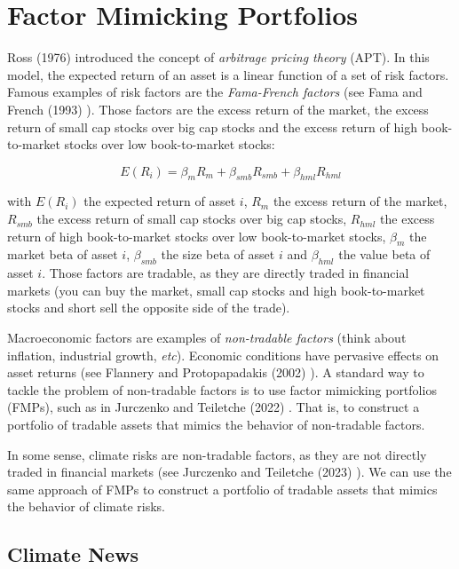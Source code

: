 \chapter{Factor Mimicking Portfolios}


Ross (1976) \cite{ross1976apt} introduced 
the concept of \textit{arbitrage pricing theory} (APT).
In this model, the expected return of an asset is
a linear function of a set of risk factors. Famous examples of risk factors are the
\textit{Fama-French factors} (see Fama and French (1993) \cite{fama1993common}).
Those factors are the excess return of the market,
the excess return of small cap stocks over big cap stocks
and the excess return of high book-to-market stocks over low book-to-market stocks:

\begin{equation}
    E(R_i) = \beta_m R_m + \beta_{smb} R_{smb} + \beta_{hml} R_{hml}
\end{equation}

with $E(R_i)$ the expected return of asset $i$,
$R_m$ the excess return of the market, $R_{smb}$ the excess return of small cap stocks over big cap stocks,
$R_{hml}$ the excess return of high book-to-market stocks over low book-to-market stocks,
$\beta_m$ the market beta of asset $i$, $\beta_{smb}$ the size beta of asset $i$ and $\beta_{hml}$ the value beta of asset $i$.
Those factors are tradable, as 
they are directly traded in financial markets (you can buy 
the market, small cap stocks and high book-to-market stocks
and short sell the opposite side of the trade).

Macroeconomic factors are examples of 
\textit{non-tradable factors} (think about inflation, 
industrial growth, \textit{etc}). Economic conditions 
have pervasive effects on asset returns (see Flannery 
and Protopapadakis (2002) \cite{flannery2002macroeconomic}).
A standard way to tackle the problem of non-tradable factors
is to use factor mimicking portfolios (FMPs), such 
as in Jurczenko and Teiletche (2022) \cite{jurczenko2022macro}. That is,
to construct a portfolio of tradable assets that
mimics the behavior of non-tradable factors. 


In some sense, climate risks are non-tradable factors,
as they are not directly traded in financial markets
(see Jurczenko and Teiletche (2023) \cite{jurczenko2023climate}).
We can use the same approach of FMPs to construct
a portfolio of tradable assets that mimics the behavior
of climate risks.

\section{Climate News}

